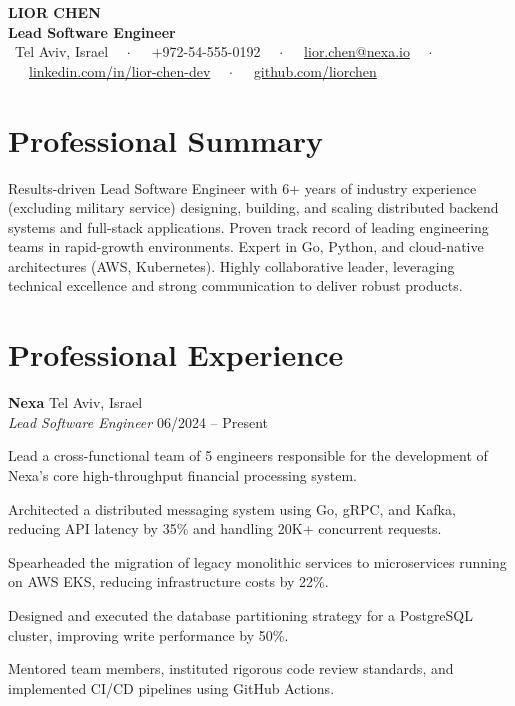 \documentclass[10pt,a4paper]{article}
\newcommand{\cventry}[4]{
  \noindent
  {\bfseries\color{primary}#1} \hfill {\color{secondary}\small#3} \\{}
  {\itshape\color{secondary}#2} \hfill {\color{lighttext}\small#4}
  \par\vspace{0.3ex}
}
\begin{document}
\color{darktext}

\begin{center}
  {\Huge \bfseries \color{primary} LIOR CHEN} \\
  \vspace{0.3em}
  {\large \bfseries \color{secondary} Lead Software Engineer} \\
  \vspace{0.5em}
  \color{secondary}
  \small
  \faMapMarker\ Tel Aviv, Israel \ \ $\cdot$\ \ 
  \faPhone\ +972-54-555-0192 \ \ $\cdot$\ \ 
  \faEnvelope\ \href{mailto:lior.chen@nexa.io}{lior.chen@nexa.io} \ \ $\cdot$\ \ 
  \faLinkedin\ \href{https://linkedin.com/in/lior-chen-dev}{linkedin.com/in/lior-chen-dev} \ \ $\cdot$\ \ 
  \faGithub\ \href{https://github.com/liorchen}{github.com/liorchen}
\end{center}

\vspace{0.4em}

\section*{Professional Summary}
Results-driven Lead Software Engineer with 6+ years of industry experience (excluding military service) designing, building, and scaling distributed backend systems and full-stack applications. Proven track record of leading engineering teams in rapid-growth environments. Expert in Go, Python, and cloud-native architectures (AWS, Kubernetes). Highly collaborative leader, leveraging technical excellence and strong communication to deliver robust products.

\section*{Professional Experience}

\cventry{Nexa}{Lead Software Engineer}{Tel Aviv, Israel}{06/2024 -- Present}
\begin{cvitems}
  \item Lead a cross-functional team of 5 engineers responsible for the development of Nexa's core high-throughput financial processing system.
  \item Architected a distributed messaging system using Go, gRPC, and Kafka, reducing API latency by 35\% and handling 20K+ concurrent requests.
  \item Spearheaded the migration of legacy monolithic services to microservices running on AWS EKS, reducing infrastructure costs by 22\%.
  \item Designed and executed the database partitioning strategy for a PostgreSQL cluster, improving write performance by 50\%.
  \item Mentored team members, instituted rigorous code review standards, and implemented CI/CD pipelines using GitHub Actions.
\end{cvitems}
\end{document}
